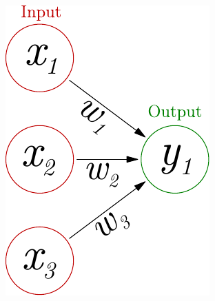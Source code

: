 \documentclass{beamer}
\newcommand{\figheight}{0.72\textheight}
\begin{document}
\begin{frame}
\begin{columns}[T]
\begin{column}{.55\textwidth}
\begin{figure}[t]
\centering
 \includegraphics[height = \figheight]{./fig/perceptron_maths.pdf}

\end{figure}
    \end{column}
  \end{columns}
\end{frame}
\end{document}

